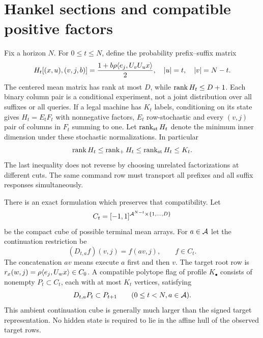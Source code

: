 \section{Hankel sections and compatible positive factors}\label{sec:hankel45}
Fix a horizon $N$. For $0\le t\le N$, define the probability prefix--suffix matrix
\begin{equation}\label{eq:hankel45}
 H_t[(x,u),(v,j,b)]=\frac{1+b\rho\langle e_j,U_vU_ux\rangle}2,
 \quad |u|=t,\quad |v|=N-t.
\end{equation}
The centered mean matrix has rank at most $D$, while $\operatorname{rank} H_t\le D+1$. Each binary column pair is a conditional experiment, not a joint distribution over all suffixes or all queries. If a legal machine has $K_t$ labels, conditioning on its state gives $H_t=E_tF_t$ with nonnegative factors, $E_t$ row-stochastic and every $(v,j)$ pair of columns in $F_t$ summing to one. Let $\operatorname{rank}_{\mathrm{st}}H_t$ denote the minimum inner dimension under these stochastic normalizations. In particular
\begin{equation}\label{eq:rank-chain45}
 \operatorname{rank} H_t\le\operatorname{rank}_+ H_t\le\operatorname{rank}_{\mathrm{st}}H_t\le K_t.
\end{equation}
The last inequality does not reverse by choosing unrelated factorizations at different cuts. The same command row must transport all prefixes and all suffix responses simultaneously.

There is an exact formulation which preserves that compatibility. Let
\[
 C_t=[-1,1]^{\mathcal A^{N-t}\times\{1,\ldots,D\}}
\]
be the compact cube of possible terminal mean arrays. For $a\in\mathcal A$ let the continuation restriction be
\[
 (D_{t,a}f)(v,j)=f(av,j),\qquad f\in C_t.
\]
The concatenation $av$ means execute $a$ first and then $v$. The target root row is
$r_x(w,j)=\rho\langle e_j,U_wx\rangle\in C_0$.
A compatible polytope flag of profile $K_\bullet$ consists of nonempty
$P_t\subset C_t$, each with at most $K_t$ vertices, satisfying
\begin{equation}\label{eq:flag45}
 D_{t,a}P_t\subset P_{t+1}\qquad(0\le t<N,
a\in\mathcal A).
\end{equation}
This ambient continuation cube is generally much larger than the signed target representation. No hidden state is required to lie in the affine hull of the observed target rows.

